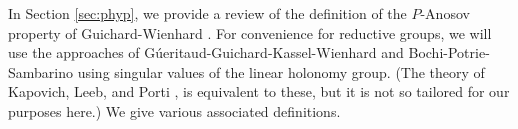 

In Section \ref{sec:phyp}, 
we provide a review of the definition of the $P$-Anosov property of 
Guichard-Wienhard \cite{GW12}. For convenience for reductive groups, we will use 
the approaches of G\'ueritaud-Guichard-Kassel-Wienhard \cite{GGKW17ii} and Bochi-Potrie-Sambarino \cite{BPS}
using singular values of the linear holonomy group. (The theory of 
Kapovich, Leeb, and Porti \cite{KL18}, \cite{KLP18iii} is equivalent to these, but it is not so
tailored for our purposes here.)
We give various associated definitions. 


